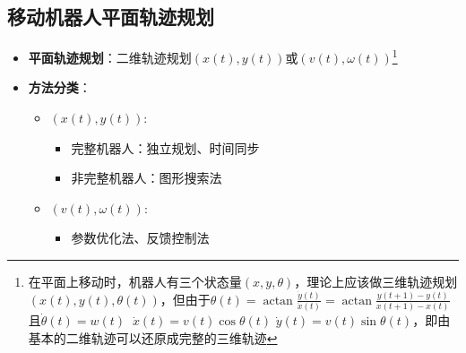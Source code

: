 \documentclass[../main.tex]{subfiles}
\begin{document}
\subsection{移动机器人平面轨迹规划}\label{sec:planar}
\begin{itemize}
    \item \textbf{平面轨迹规划}：二维轨迹规划$(x(t),y(t))$或$(v(t),\omega(t))$\footnote{在平面上移动时，机器人有三个状态量$(x,y,\theta)$，理论上应该做三维轨迹规划$(x(t),y(t),\theta(t))$，但由于\( \theta \left( t\right)  = \operatorname{actan}\frac{\dot{y}\left( t\right) }{\dot{x}\left( t\right) } = \operatorname{actan}\frac{y\left( {t + 1}\right)  - y\left( t\right) }{x\left( {t + 1}\right)  - x\left( t\right) } \) 且\( \dot{\theta }\left( t\right)  = w\left( t\right) \) \( \ \dot{x}\left( t\right)  = v\left( t\right) \cos \theta \left( t\right) \) \( \dot{y}\left( t\right)  = v\left( t\right) \sin \theta \left( t\right) \)，即由基本的二维轨迹可以还原成完整的三维轨迹}
    \item \textbf{方法分类}：
        \begin{itemize}
            \item $(x(t),y(t))$:
                \begin{itemize}
                    \item 完整机器人：独立规划、时间同步
                    \item 非完整机器人：图形搜索法
                \end{itemize}
            \item $(v(t),\omega(t))$:
                \begin{itemize}
                    \item 参数优化法、反馈控制法
                \end{itemize}
        \end{itemize}
\end{itemize}
\end{document}

